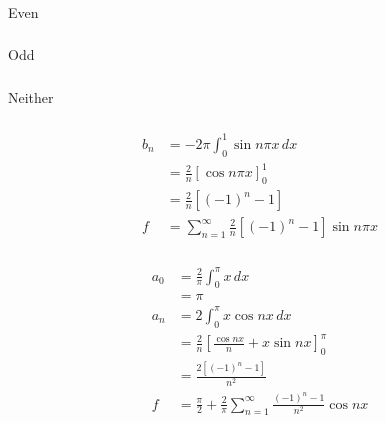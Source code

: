 \documentclass{article}
\begin{document}
\setcounter{subsubsection}{4}
\subsubsection{}

Even

\setcounter{subsubsection}{6}
\subsubsection{}

Odd

\setcounter{subsubsection}{8}
\subsubsection{}

Neither

\setcounter{subsubsection}{10}
\subsubsection{}

\begin{align*}
  b_n & = -2 \pi \int_0^1 \sin n \pi x \,d x                        \\
      & = \frac{2}{n} [\cos n \pi x]_0^1                            \\
      & = \frac{2}{n} [(-1)^n - 1]                                  \\
  f   & = \sum_{n = 1}^\infty \frac{2}{n} [(-1)^n - 1] \sin n \pi x
\end{align*}

\setcounter{subsubsection}{12}
\subsubsection{}

\begin{align*}
  a_0 & = \frac{2}{\pi} \int_0^\pi x \,d x                                                  \\
      & = \pi                                                                               \\
  a_n & = 2 \int_0^\pi x \cos n x \,d x                                                     \\
      & = \frac{2}{n} \left[ \frac{\cos n x}{n} + x \sin n x \right]_0^\pi                  \\
      & = \frac{2 [(-1)^n - 1]}{n^2}                                                        \\
  f   & = \frac{\pi}{2} + \frac{2}{\pi} \sum_{n = 1}^\infty \frac{(-1)^n - 1}{n^2} \cos n x
\end{align*}
\end{document}
